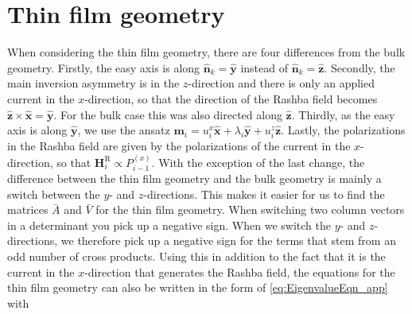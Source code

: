 \section{Thin film geometry}
When considering the thin film geometry, there are four differences from the bulk geometry. Firstly, the easy axis is along $\mathbold{\hat{n}}_k = \mathbold{\hat{y}}$ instead of $\mathbold{\hat{n}}_k = \mathbold{\hat{z}}$. Secondly, the main inversion asymmetry is in the $z$-direction and there is only an applied current in the $x$-direction, so that the direction of the Rashba field becomes $\mathbold{\hat{z}}\times\mathbold{\hat{x}} = \mathbold{\hat{y}}$. For the bulk case this was also directed along $\mathbold{\hat{z}}$. Thirdly, as the easy axis is along $\mathbold{\hat{y}}$, we use the ansatz $\mathbold{m}_i = u^x_i\mathbold{\hat{x}}+\lambda_i\mathbold{\hat{y}}+u^z_i\mathbold{\hat{z}}$. Lastly, the polarizations in the Rashba field are given by the polarizations of the current in the $x$-direction, so that $\mathbold{H}^{\textrm{R}}_i \propto P^{(x)}_{i-1}$. With the exception of the last change, the difference between the thin film geometry and the bulk geometry is mainly a switch between the $y$- and $z$-directions. This makes it easier for us to find the matrices $\bar{A}$ and $\bar{V}$ for the thin film geometry. When switching two column vectors in a determinant you pick up a negative sign. When we switch the $y$- and $z$-directions, we therefore pick up a negative sign for the terms that stem from an odd number of cross products. Using this in addition to the fact that it is the current in the $x$-direction that generates the Rashba field, the equations for the thin film geometry can also be written in the form of \eqref{eq:EigenvalueEqn_app} with 
